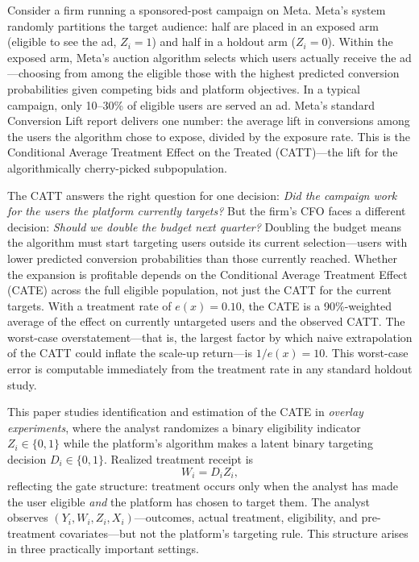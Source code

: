 \documentclass[11pt]{article}
\begin{document}
Consider a firm running a sponsored-post campaign on Meta.  Meta's system
randomly partitions the target audience: half are placed in an exposed arm
(eligible to see the ad, $Z_i = 1$) and half in a holdout arm ($Z_i = 0$).
Within the exposed arm, Meta's auction algorithm selects which users actually
receive the ad---choosing from among the eligible those with the highest
predicted conversion probabilities given competing bids and platform objectives.
In a typical campaign, only 10--30\% of eligible users are served an ad.
Meta's standard Conversion Lift report delivers one number: the average lift in
conversions among the users the algorithm chose to expose, divided by the
exposure rate.  This is the Conditional Average Treatment Effect on the Treated
(CATT)---the lift for the algorithmically cherry-picked subpopulation.

The CATT answers the right question for one decision: \emph{Did the campaign
work for the users the platform currently targets?}  But the firm's CFO faces a
different decision: \emph{Should we double the budget next quarter?}  Doubling
the budget means the algorithm must start targeting users outside its current
selection---users with lower predicted conversion probabilities than those
currently reached.  Whether the expansion is profitable depends on the
Conditional Average Treatment Effect (CATE) across the full eligible population,
not just the CATT for the current targets.  With a treatment rate of
$e(x) = 0.10$, the CATE is a 90\%-weighted average of the effect on
currently untargeted users and the observed CATT.  The worst-case
overstatement---that is, the largest factor by which naive extrapolation of the
CATT could inflate the scale-up return---is $1/e(x) = 10$.  This worst-case
error is computable immediately from the treatment rate in any standard holdout
study.

This paper studies identification and estimation of the CATE in \emph{overlay
experiments}, where the analyst randomizes a binary eligibility indicator
$Z_i \in \{0,1\}$ while the platform's algorithm makes a latent binary targeting
decision $D_i \in \{0,1\}$.  Realized treatment receipt is
\[
  W_i = D_i Z_i,
\]
reflecting the gate structure: treatment occurs only when the analyst has made
the user eligible \emph{and} the platform has chosen to target them.  The
analyst observes $(Y_i, W_i, Z_i, X_i)$---outcomes, actual treatment,
eligibility, and pre-treatment covariates---but not the platform's targeting
rule.  This structure arises in three practically important settings.
\end{document}
